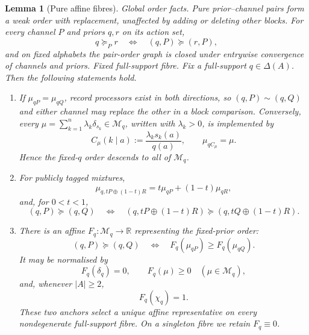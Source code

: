 \documentclass[11pt,a4paper]{article}
\newtheorem{lemma}[theorem]{Lemma}
\theoremstyle{definition}
\newcommand{\1}{\mathbf 1}
\begin{document}
\begin{lemma}[Pure affine fibres]
\label{pt:lem:pure-affine}
\label{pt:lem:blockcoh}
\label{pt:lem:blackwell}\label{pt:lem:plsuff}
\label{pt:lem:publiccoin}
\label{pt:lem:postsep}
\label{pt:lem:convnorm}
\emph{Global order facts.}
Pure prior--channel pairs form a weak order with replacement, unaffected by
adding or deleting other blocks.  For every channel $P$ and priors $q,r$ on
its action set,
\begin{equation}
 q\succeq_P r
 \quad\Longleftrightarrow\quad
 (q,P)\succeq(r,P),
 \label{pt:eq:within-to-pair}
\end{equation}
and on fixed alphabets the pair-order graph is closed under entrywise
convergence of channels and priors.  \emph{Fixed full-support fibre.}
Fix a full-support $q\in\Delta(A)$.
Then the following statements hold.

\begin{enumerate}[label=\textup{(\alph*)},leftmargin=*]
\item If $\mu_{qP}=\mu_{qQ}$, record processors exist in both directions,
  so $(q,P)\sim(q,Q)$ and either channel may replace the other in a block
  comparison.  Conversely, every
  $\mu=\sum_{k=1}^n\lambda_k\delta_{s_k}\in\mathcal M_q$, written with
  $\lambda_k>0$, is implemented by
  \begin{equation}
   C_\mu(k\mid a):=\frac{\lambda_ks_k(a)}{q(a)},
   \qquad \mu_{qC_\mu}=\mu.
   \label{pt:eq:canonical-implementation}
  \end{equation}
  Hence the fixed-$q$ order descends to all of $\mathcal M_q$.

\item For publicly tagged mixtures,
  \begin{equation}
   \mu_{q,tP\oplus(1-t)R}
   =t\mu_{qP}+(1-t)\mu_{qR},
   \label{pt:eq:public-posterior-mixture}
  \end{equation}
  and, for $0<t<1$,
  \[
   (q,P)\succeq(q,Q)
   \quad\Longleftrightarrow\quad
   (q,tP\oplus(1-t)R)\succeq(q,tQ\oplus(1-t)R).
  \]

\item There is an affine $F_q:\mathcal M_q\to\mathbb R$ representing the
  fixed-prior order:
  \begin{equation}
   (q,P)\succeq(q,Q)
   \quad\Longleftrightarrow\quad
   F_q(\mu_{qP})\ge F_q(\mu_{qQ}).
   \label{pt:eq:fibre-representation}
  \end{equation}
  It may be normalised by
\begin{equation}
 F_q(\delta_q)=0,
 \qquad
 F_q(\mu)\ge0\quad(\mu\in\mathcal M_q),
 \label{pt:eq:zero-minimum}
\end{equation}
and, whenever $|A|\ge2$,
\begin{equation}
 F_q(\chi_q)=1.
 \label{pt:eq:full-revelation-anchor}
\end{equation}
These two anchors select a unique affine representative on every
nondegenerate full-support fibre.  On a singleton fibre we retain
$F_q\equiv0$.
\end{enumerate}
\end{lemma}
\end{document}
